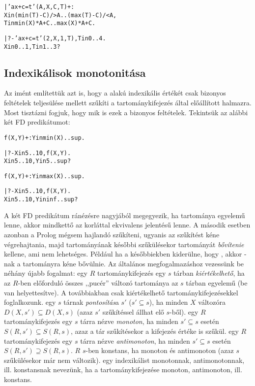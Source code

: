 \begin{alltt}
| 'ax+c=t'(A,X,C,T) +:  % feltétel: A > 0
        X in (min(T) - C) /> A .. (max(T) - C) /< A,
        T in min(X)*A + C      ..  max(X)*A + C.

| ?- 'ax+c=t'(2,X,1,T), T in 0..4.
X in 0..1, T in 1..3 ?
\end{alltt}

\subsection{Indexikálisok monotonitása}

Az imént említettük azt is, hogy a  alakú indexikális
 értékét csak bizonyos feltételek teljesülése mellett szűkíti
a  tartománykifejezés által előállított halmazra. Most tisztázni fogjuk,
hogy mik is ezek a bizonyos feltételek. Tekintsük az alábbi két FD predikátumot:

\begin{alltt}
f(X, Y) +: Y in min(X)..sup.

| ?- X in 5..10, f(X, Y).
X in 5..10, Y in 5..sup?

f(X, Y) +: Y in max(X)..sup.

| ?- X in 5..10, f(X, Y).
X in 5..10, Y in inf..sup?
\end{alltt}

A két FD predikátum ránézésre nagyjából megegyezik, ha  tartománya egyelemű
lenne, akkor mindkettő az  korláttal ekvivalens jelentésű lenne. A második
esetben azonban a Prolog mégsem hajlandó szűkíteni, ugyanis az 
szűkítést kéne végrehajtania, majd  tartományának későbbi szűkülésekor 
tartományát \emph{bővítenie} kellene, ami nem lehetséges. Például ha a későbbiekben
kiderülne, hogy , akkor -nak a  tartományra kéne
bővülnie.
\br
Az általános megfogalmazáshoz vezessünk be néhány újabb fogalmat:
\br
{} egy $R$ tartománykifejezés egy $s$ tárban \emph{kiértékelhető}, ha az
$R$-ben előforduló összes ,,pucér'' változó tartománya az $s$ tárban
egyelemű (be van helyettesítve). A továbbiakban csak kiértékelhető
tartománykifejezésekkel foglalkozunk.
\br
{} egy $s$ tárnak \emph{pontosítás}a $s'$ ($s' \subseteq s$), ha minden
$X$ változóra $D(X,s') \subseteq D(X,s)$ (azaz $s'$ szűkítéssel állhat elő $s$-ből).
\br
{} egy $R$ tartománykifejezés egy $s$ tárra nézve \emph{monoton}, ha
minden $s' \subseteq s$ esetén $S(R,s') \subseteq S(R,s)$, azaz a tár
szűkítésekor a kifejezés értéke is szűkül.
\br
{} egy $R$ tartománykifejezés egy $s$ tárra nézve \emph{antimonoton}, ha
minden $s' \subseteq s$ esetén $S(R,s') \supseteq S(R,s)$.
\br
{} $R$ $s$-ben konstans, ha monoton és antimonoton (azaz $s$ szűkülésekor
már nem változik).
\br
{} egy indexikálist monotonnak, antimonotonnak, ill. konstansnak nevezünk,
ha a tartománykifejezése monoton, antimonoton, ill. konstans. 

